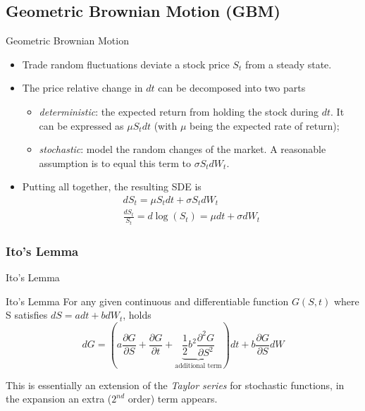 \documentclass{beamer}
\begin{document}
\subsection{Geometric Brownian Motion (GBM)}
\begin{frame}{Geometric Brownian Motion}
\begin{itemize}
	\item Trade random fluctuations deviate a stock price $S_t$ from a steady state.
	\item The price relative change in $dt$ can be decomposed into two parts
	\begin{itemize}
		\item \emph{deterministic}: the expected return from holding the stock during $dt$. It can be expressed as $\mu S_tdt$ (with $\mu$ being the expected rate of return);
		\item \emph{stochastic}: model the random changes of the market. A reasonable assumption is to equal this term to $\sigma S_t dW_t$. 
	\end{itemize}
	\item Putting all together, the resulting SDE is
	\begin{equation}
		\begin{gathered}
		dS_t = \mu S_t dt + \sigma S_t dW_t \\
		\frac{dS_t}{S_t} = d\log(S_t) = \mu dt + \sigma dW_t
		\end{gathered}
		\label{eq:log_normal_sde}
	\end{equation}
\end{itemize}
\end{frame}

\subsubsection{Ito's Lemma}
\begin{frame}{Ito's Lemma}
	\begin{block}{Ito's Lemma}
	For any given continuous and differentiable function $G(S,t)$ where S satisfies $dS=adt + bdW_t$, holds
	\begin{equation}
	dG = \left(a\frac{\partial G}{\partial S} + \frac{\partial G}{\partial t} + \underbrace{\frac{1}{2}b^2\frac{\partial^2 G}{\partial S^2}}_{\text{additional term}}\right)dt + b\frac{\partial G}{\partial S} dW
	\label{eq:itos_lemma}
	\end{equation}
	\end{block}

	This is essentially an extension of the \emph{Taylor series} for stochastic functions, in the expansion an extra ($2^{nd}$ order) term appears.
\end{frame}
\end{document}

